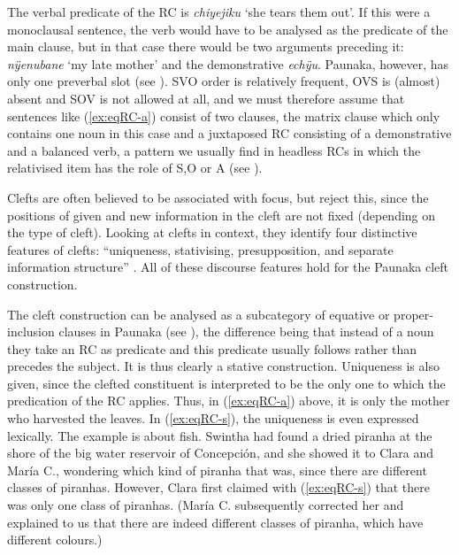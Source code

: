 The verbal predicate of the RC is \textit{chiyejiku} ‘she tears them out’. If this were a monoclausal sentence, the verb would have to be analysed as the predicate of the main clause, but in that case there would be two arguments preceding it: \textit{nÿenubane} ‘my late mother’ and the demonstrative \textit{echÿu}. Paunaka, however, has only one preverbal slot (see ). SVO order is relatively frequent, OVS is (almost) absent and SOV is not allowed at all, and we must therefore assume that sentences like (\ref{ex:eqRC-a}) consist of two clauses, the matrix clause which only contains one noun in this case and a juxtaposed RC consisting of a demonstrative and a balanced verb, a pattern we usually find in headless RCs in which the relativised item has the role of S,O or A (see ).

Clefts are often believed to be associated with focus, but \citet[5]{DelinOberlander2005} reject this, since the positions of given and new information in the cleft are not fixed (depending on the type of cleft). Looking at clefts in context, they identify four distinctive features of clefts: “uniqueness, stativising, presupposition, and separate information structure” \citep[1]{DelinOberlander2005}. All of these discourse features hold for the Paunaka cleft construction.

The cleft construction can be analysed as a subcategory of equative or proper-inclusion clauses in Paunaka (see ), the difference being that instead of a noun they take an RC as predicate and this predicate usually follows rather than precedes the subject. It is thus clearly a stative construction. Uniqueness is also given, since the clefted constituent is interpreted to be the only one to which the predication of the RC applies. Thus, in (\ref{ex:eqRC-a}) above, it is only the mother who harvested the leaves. In (\ref{ex:eqRC-s}), the uniqueness is even expressed lexically. The example is about fish. Swintha had found a dried piranha at the shore of the big water reservoir of Concepción, and she showed it to Clara and María C., wondering which kind of piranha that was, since there are different classes of piranhas. However, Clara first claimed with (\ref{ex:eqRC-s}) that there was only one class of piranhas. (María C. subsequently corrected her and explained to us that there are indeed different classes of piranha, which have different colours.)


